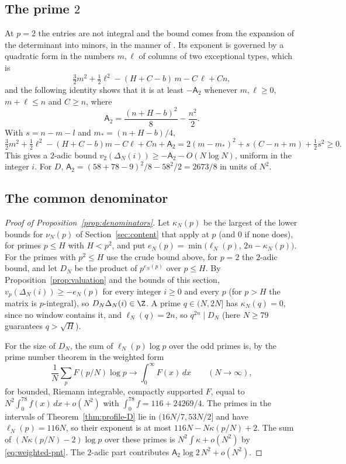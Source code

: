 \subsection{The prime $2$}
At $p=2$ the entries are not integral and the bound comes from the expansion of the determinant into
minors, in the manner of \cite[\S3]{OpenAI2026}. Its exponent is governed by a quadratic form in the
numbers $m,\ell$ of columns of two exceptional types, which is
\[
 \tfrac32m^2+\tfrac12\ell^2-(H+C-b)\,m-C\,\ell+Cn ,
\]
and the following identity shows that it is at least $-\mathsf A_2$ whenever $m,\ell\ge0$,
$m+\ell\le n$ and $C\ge n$, where
\begin{equation}\label{eq:A2}
 \mathsf A_2=\frac{(n+H-b)^2}8-\frac{n^2}2 .
\end{equation}
With $s=n-m-l$ and $m_*=(n+H-b)/4$,
\[
 \tfrac32m^2+\tfrac12\ell^2-(H+C-b)m-C\ell+Cn+\mathsf A_2
 =2(m-m_*)^2+s\,(C-n+m)+\tfrac12s^2\ge0 .
\]
This gives a $2$-adic bound $v_2(\Delta_N(i))\ge-\mathsf A_2-O(N\log N)$, uniform in the integer $i$. For $D$,
$\mathsf A_2=(58+78-9)^2/8-58^2/2=2673/8$ in units of $N^2$.

\subsection{The common denominator}
\begin{proof}[Proof of Proposition~\ref{prop:denominators}]
Let $\kappa_N(p)$ be the largest of the lower bounds for $\nu_N(p)$ of Section~\ref{sec:content} that apply at
$p$ (and $0$ if none does), for primes $p\le H$ with $H<p^2$, and put $e_N(p)=\min\bigl(\ell_N(p),\,2n-\kappa_N(p)\bigr)$. For the
primes with $p^2\le H$ use the crude bound above, for $p=2$ the $2$-adic bound, and let $D_N$ be the
product of $p^{e_N(p)}$ over $p\le H$. By Proposition~\ref{prop:valuation} and the bounds of this section,
$v_p(\Delta_N(i))\ge-e_N(p)$ for every integer $i\ge0$ and every $p$ (for $p>H$ the matrix is
$p$-integral), so $D_N\Delta_N(i)\in\Z$. A prime $q\in(N,2N]$ has $\kappa_N(q)=0$, since no window
contains it, and $\ell_N(q)=2n$, so $q^{2n}\mid D_N$ (here $N\ge79$ guarantees $q>\sqrt H$).

For the size of $D_N$, the sum of $\ell_N(p)\log p$ over the odd primes is, by the prime number theorem in
the weighted form
\begin{equation}\label{eq:weighted-pnt}
 \frac1N\sum_{p}F(p/N)\log p\longrightarrow\int_0^\infty F(x)\,dx\qquad(N\to\infty),
\end{equation}
for bounded, Riemann integrable, compactly supported $F$, equal to $N^2\int_0^{78}f(x)\,dx+o(N^2)$ with
$\int_0^{78}f=116+24269/4$. The primes in the intervals of Theorem~\ref{thm:profile-D} lie in
$(16N/7,53N/2]$ and have $\ell_N(p)=116N$, so their exponent is at most $116N-N\kappa(p/N)+2$. The sum of
$(N\kappa(p/N)-2)\log p$ over these primes is $N^2\int\kappa+o(N^2)$ by \eqref{eq:weighted-pnt}. The $2$-adic part contributes
$\mathsf A_2\log2\,N^2+o(N^2)$.
\end{proof}

